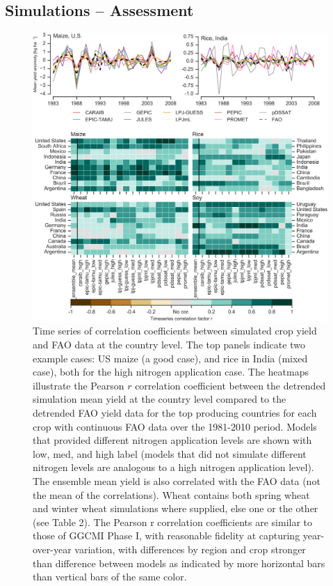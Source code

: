 \documentclass[gmd, manuscript]{copernicus} %
\begin{document}
\subsection{Simulations -- Assessment}
\label{A:1}

\begin{figure}[t]
    \centering
    \includegraphics[width=15cm]{figures/Agformet_validation.png}
    \caption{Time series of correlation coefficients between simulated crop yield and FAO data \citep{FAOSTAT} at the country level. The top panels indicate two example cases: US maize (a good case), and rice in India (mixed case), both for the high nitrogen application case. The heatmaps illustrate the Pearson $r$ correlation coefficient between the detrended simulation mean yield at the country level compared to the detrended FAO yield data for the top producing countries for each crop with continuous FAO data over the 1981-2010 period. Models that provided different nitrogen application levels are shown with low, med, and high label (models that did not simulate different nitrogen levels are analogous to a high nitrogen application level). The ensemble mean yield is also correlated with the FAO data (not the mean of the correlations). Wheat contains both spring wheat and winter wheat simulations where supplied, else one or the other (see Table 2). The Pearson r correlation coefficients are similar to those of GGCMI Phase I, with reasonable fidelity at capturing year-over-year variation, with differences by region and crop stronger than difference between models as indicated by more horizontal bars than vertical bars of the same color.}
    \label{fig:simulation_val}
\end{figure}
\end{document}
